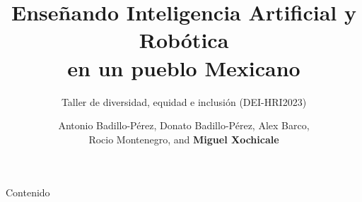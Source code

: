 \documentclass[xcolor={dvipsnames},aspectratio=169,10pt]{beamer}
\title{
Ense\~nando Inteligencia Artificial y Rob\'otica \\ 
en un pueblo Mexicano \\
}
\subtitle{
Taller de diversidad, equidad e inclusi\'on (DEI-HRI2023) 
}
\author{
Antonio Badillo-P\'erez,
Donato Badillo-P\'erez, 
Alex Barco, \\ 
Rocio Montenegro, and
{\bf Miguel Xochicale}
}
\date{
}
\institute{
	\faEnvelope \space  air4children@gmail.com \\
	\faGithubAlt \space @air4children \faTwitter \space @air4children  
		}
\begin{document}
\maketitle

\begin{frame}{Contenido}
    \tableofcontents
\end{frame}








\maketitle
\end{document}
